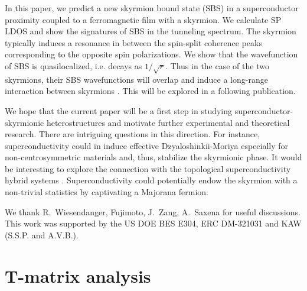 \documentclass[twocolumn,showpacs,floatfix,longbibliography]{revtex4-1}
\begin{document}
In this paper, we predict a new skyrmion bound state (SBS) in a superconductor proximity coupled to a ferromagnetic film with a skyrmion. We calculate SP LDOS and show the signatures of SBS in the tunneling spectrum. The skyrmion typically induces a resonance in between the spin-split coherence peaks corresponding to the opposite spin polarizations. We show that the wavefunction of SBS is quasilocalized, i.e. decays as $1/\sqrt{r}$. Thus in the case of the two skyrmions, their SBS wavefunctions will overlap and induce a long-range interaction between skyrmions \cite{Yao2014,Menard2015}. This will be explored in a following publication. 

We hope that the current paper will be a first step in studying superconductor-skyrmionic heterostructures and motivate further experimental and theoretical research. There are intriguing questions in this direction. For instance, superconductivity could in induce effective Dzyaloshinkii-Moriya especially for non-centrosymmetric materials and, thus, stabilize the skyrmionic phase. It would be interesting to explore the connection with the topological superconductivity hybrid systems \cite{Alicea2012}. Superconductivity could potentially endow the skyrmion with a non-trivial statistics by captivating a Majorana fermion. 



We thank  R.~Wiesendanger, Fujimoto, J.~Zang, A.~Saxena for useful discussions. This work was supported by the US DOE BES E304, ERC DM-321031 and KAW (S.S.P. and A.V.B.). 

\newpage

%



\appendix 

\section{T-matrix analysis} \label{sec:appendixTMatrix}
\end{document}
